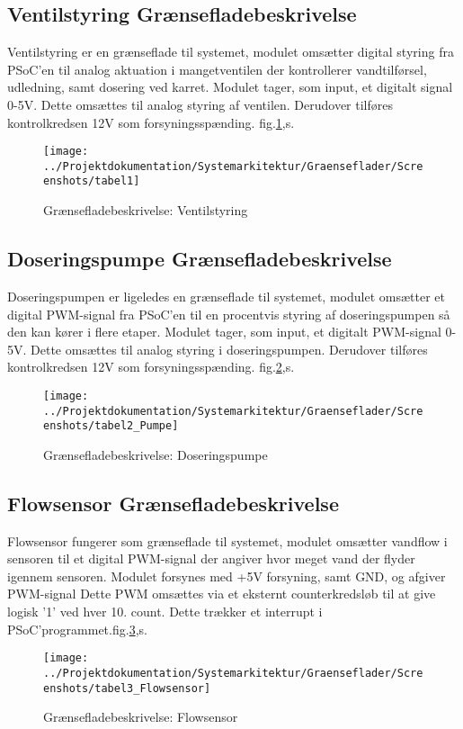 
\subsection{Ventilstyring Grænsefladebeskrivelse}

Ventilstyring er en grænseflade til systemet, modulet omsætter digital styring fra PSoC'en til analog aktuation i mangetventilen der kontrollerer vandtilførsel, udledning, samt dosering ved karret. 
Modulet tager, som input, et digitalt signal 0-5V. Dette omsættes til analog styring af ventilen. 
Derudover tilføres kontrolkredsen 12V som forsyningsspænding. fig.\ref{screenshot:tabel1},s.\pageref{screenshot:tabel1}

\begin{figure}[H]
	\centering
	\texttt{[image: ../Projektdokumentation/Systemarkitektur/Graenseflader/Screenshots/tabel1]}
	\caption{Grænsefladebeskrivelse: Ventilstyring}
	\label{screenshot:tabel1}
\end{figure}


\subsection{Doseringspumpe Grænsefladebeskrivelse}

Doseringspumpen er ligeledes en grænseflade til systemet, modulet omsætter et digital PWM-signal fra PSoC'en til en procentvis styring af doseringspumpen så den kan kører i flere etaper. Modulet tager, som input, et digitalt PWM-signal 0-5V. Dette omsættes til analog styring i doseringspumpen. 
Derudover tilføres kontrolkredsen 12V som forsyningsspænding. fig.\ref{screenshot:tabel2},s.\pageref{screenshot:tabel2}  

\begin{figure}[H]
	\centering
	\texttt{[image: ../Projektdokumentation/Systemarkitektur/Graenseflader/Screenshots/tabel2\_Pumpe]}
	\caption{Grænsefladebeskrivelse: Doseringspumpe}
	\label{screenshot:tabel2}
\end{figure}


\subsection{Flowsensor Grænsefladebeskrivelse}
Flowsensor fungerer som grænseflade til systemet, modulet omsætter vandflow i sensoren til et digital PWM-signal der angiver hvor meget vand der flyder igennem sensoren. Modulet forsynes med +5V forsyning, samt GND, og afgiver PWM-signal 
Dette PWM omsættes via et eksternt counterkredsløb til at give logisk '1' ved hver 10. count. Dette trækker et interrupt i PSoC'programmet.fig.\ref{screenshot:tabel3},s.\pageref{screenshot:tabel3}

\begin{figure}[H]
	\centering
	\texttt{[image: ../Projektdokumentation/Systemarkitektur/Graenseflader/Screenshots/tabel3\_Flowsensor]}
	\caption{Grænsefladebeskrivelse: Flowsensor}
	\label{screenshot:tabel3}
\end{figure}
